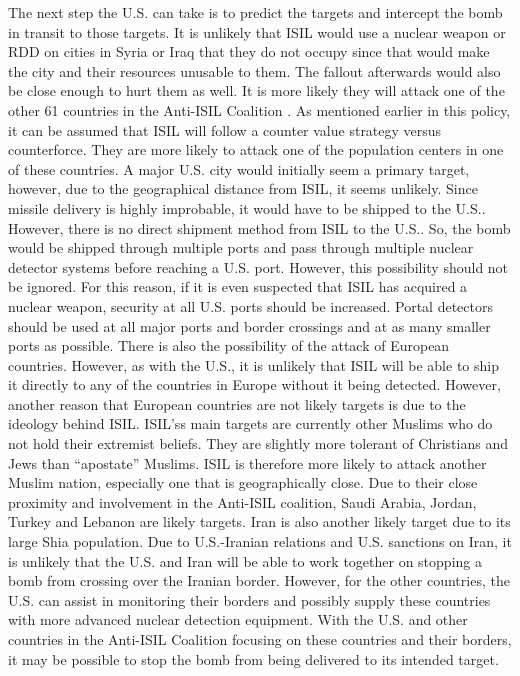\documentclass{report}
\begin{document}
The next step the U.S. can take is to predict the targets and intercept the bomb in transit to those targets.  It is unlikely that ISIL would use a nuclear weapon or RDD on cities in Syria or Iraq that they do not occupy since that would make the city and their resources unusable to them.  The fallout afterwards would also be close enough to hurt them as well.  It is more likely they will attack one of the other 61 countries in the Anti-ISIL Coalition \cite{Wordsworth2015}.  As mentioned earlier in this policy, it can be assumed that ISIL will follow a counter value strategy versus counterforce.  They are more likely to attack one of the population centers in one of these countries.  A major U.S. city would initially seem a primary target, however, due to the geographical distance from ISIL, it seems unlikely.  Since missile delivery is highly improbable, it would have to be shipped to the U.S..  However, there is no direct shipment method from ISIL to the U.S..  So, the bomb would be shipped through multiple ports and pass through multiple nuclear detector systems before reaching a U.S. port.  However, this possibility should not be ignored.  For this reason, if it is even suspected that ISIL has acquired a nuclear weapon, security at all U.S. ports should be increased.  Portal detectors should be used at all major ports and border crossings and at as many smaller ports as possible.  There is also the possibility of the attack of European countries.   However, as with the U.S., it is unlikely that ISIL will be able to ship it directly to any of the countries in Europe without it being detected.  However, another reason that European countries are not likely targets is due to the ideology behind ISIL.  ISIL'ss main targets are currently other Muslims who do not hold their extremist beliefs.  They are slightly more tolerant of Christians and Jews than \enquote{apostate} Muslims. \cite{Wood2015}  ISIL is therefore more likely to attack another Muslim nation, especially one that is geographically close.  Due to their close proximity and involvement in the Anti-ISIL coalition, Saudi Arabia, Jordan, Turkey and Lebanon are likely targets.  Iran is also another likely target due to its large Shia population.  Due to U.S.-Iranian relations and U.S. sanctions on Iran, it is unlikely that the U.S. and Iran will be able to work together on stopping a bomb from crossing over the Iranian border.  However, for the other countries, the U.S. can assist in monitoring their borders and possibly supply these countries with more advanced nuclear detection equipment.  With the U.S. and other countries in the Anti-ISIL Coalition focusing on these countries and their borders, it may be possible to stop the bomb from being delivered to its intended target.
\end{document}
